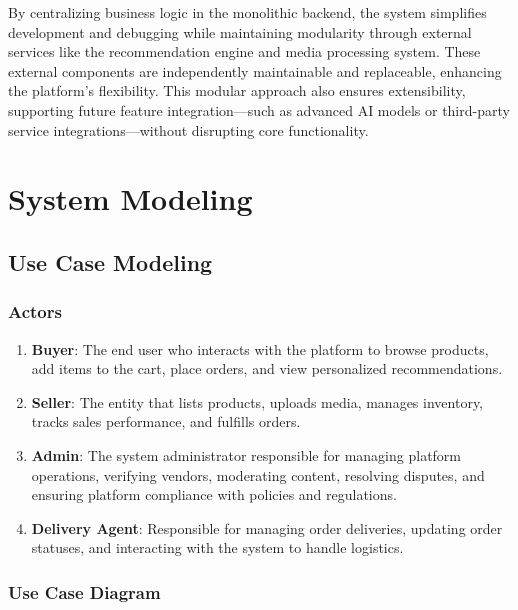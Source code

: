 \documentclass[12pt]{report}
\begin{document}
By centralizing business logic in the monolithic backend, the system simplifies development
and debugging while maintaining modularity through external services like the
recommendation engine and media processing system. These external components are
independently maintainable and replaceable, enhancing the platform’s flexibility. This
modular approach also ensures extensibility, supporting future feature integration—such as
advanced AI models or third-party service integrations—without disrupting core
functionality.

\section{System Modeling}

\subsection {Use Case Modeling}

\subsubsection {Actors}

\begin{enumerate}
	\item \textbf{Buyer}: The end user who interacts with the platform to browse products, add items to
	      the cart, place orders, and view personalized recommendations.
	\item \textbf{Seller}: The entity that lists products, uploads media, manages inventory, tracks sales
	      performance, and fulfills orders.
	\item \textbf{Admin}: The system administrator responsible for managing platform operations,
	      verifying vendors, moderating content, resolving disputes, and ensuring
	      platform compliance with policies and regulations.
	\item \textbf{Delivery Agent}: Responsible for managing order deliveries, updating order statuses, and
	      interacting with the system to handle logistics.
\end{enumerate}

\subsubsection {Use Case Diagram}
\end{document}

